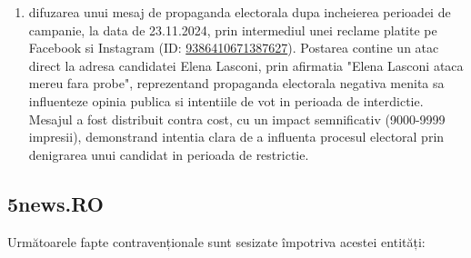 \documentclass[a4paper,12pt]{article}
\begin{document}
\begin{enumerate}[leftmargin=*, label=\arabic*.)]
    \item difuzarea unui mesaj de propaganda electorala dupa incheierea perioadei de campanie, la data de 23.11.2024, prin intermediul unei reclame platite pe Facebook si Instagram (ID: \href{https://www.facebook.com/ads/library/?id=9386410671387627}{9386410671387627}). Postarea contine un atac direct la adresa candidatei Elena Lasconi, prin afirmatia "Elena Lasconi ataca mereu fara probe", reprezentand propaganda electorala negativa menita sa influenteze opinia publica si intentiile de vot in perioada de interdictie. Mesajul a fost distribuit contra cost, cu un impact semnificativ (9000-9999 impresii), demonstrand intentia clara de a influenta procesul electoral prin denigrarea unui candidat in perioada de restrictie.
\end{enumerate}

\vspace{0.5cm}

\subsection{5news.RO}
Următoarele fapte contravenționale sunt sesizate împotriva acestei entități:
\end{document}
